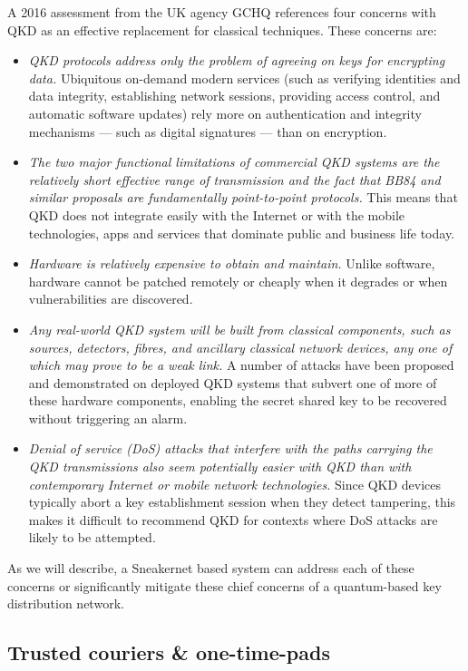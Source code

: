 \documentclass[twocolumn, aps, rmp, amsmath, amssymb, nofootinbib, superscriptaddress, longbibliography, floatfix, table-of-contents, eqsecnum]{revtex4-2}
\begin{document}
A 2016 assessment from the UK agency GCHQ references four concerns with QKD as an effective replacement for classical techniques. These concerns are:
\begin{itemize}
\item \textit{QKD protocols address only the problem of agreeing on keys for encrypting data.} Ubiquitous on-demand modern services (such as verifying identities and data integrity, establishing network sessions, providing access control, and automatic software updates) rely more on authentication and integrity mechanisms — such as digital signatures — than on encryption.
\item \textit{The two major functional limitations of commercial QKD systems are the relatively short effective range of transmission and the fact that BB84 and similar proposals are fundamentally point-to-point protocols.} This means that QKD does not integrate easily with the Internet or with the mobile technologies, apps and services that dominate public and business life today.
\item \textit{Hardware is relatively expensive to obtain and maintain.} Unlike software, hardware cannot be patched remotely or cheaply when it degrades or when vulnerabilities are discovered.
\item \textit{Any real-world QKD system will be built from classical components, such as sources, detectors, fibres, and ancillary classical network devices, any one of which may prove to be a weak link.} A number of attacks have been proposed and demonstrated on deployed QKD systems that subvert one of more of these hardware components, enabling the secret shared key to be recovered without triggering an alarm.
\item \textit{Denial of service (DoS) attacks that interfere with the paths carrying the QKD transmissions also seem potentially easier with QKD than with contemporary Internet or mobile network technologies.} Since QKD devices typically abort a key establishment session when they detect tampering, this makes it difficult to recommend QKD for contexts where DoS attacks are likely to be attempted.
\end{itemize}

As we will describe, a Sneakernet based system can address each of these concerns or significantly mitigate these chief concerns of a quantum-based key distribution network.

\subsection{Trusted couriers \& one-time-pads}
\end{document}
